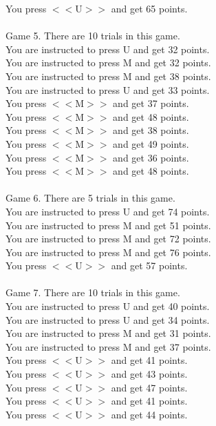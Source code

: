 \documentclass[pdflatex,sn-nature]{sn-jnl}%
\theoremstyle{thmstyleone}%
\theoremstyle{thmstyletwo}%
\theoremstyle{thmstylethree}%
\begin{document}
You press $<<$U$>>$ and get 65 points. $~$\\ 
 $~$\\ 
Game 5. There are 10 trials in this game. $~$\\ 
You are instructed to press U and get 32 points. $~$\\ 
You are instructed to press M and get 32 points. $~$\\ 
You are instructed to press M and get 38 points. $~$\\ 
You are instructed to press U and get 33 points. $~$\\ 
You press $<<$M$>>$ and get 37 points. $~$\\ 
You press $<<$M$>>$ and get 48 points. $~$\\ 
You press $<<$M$>>$ and get 38 points. $~$\\ 
You press $<<$M$>>$ and get 49 points. $~$\\ 
You press $<<$M$>>$ and get 36 points. $~$\\ 
You press $<<$M$>>$ and get 48 points. $~$\\ 
 $~$\\ 
Game 6. There are 5 trials in this game. $~$\\ 
You are instructed to press U and get 74 points. $~$\\ 
You are instructed to press M and get 51 points. $~$\\ 
You are instructed to press M and get 72 points. $~$\\ 
You are instructed to press M and get 76 points. $~$\\ 
You press $<<$U$>>$ and get 57 points. $~$\\ 
 $~$\\ 
Game 7. There are 10 trials in this game. $~$\\ 
You are instructed to press U and get 40 points. $~$\\ 
You are instructed to press U and get 34 points. $~$\\ 
You are instructed to press M and get 31 points. $~$\\ 
You are instructed to press M and get 37 points. $~$\\ 
You press $<<$U$>>$ and get 41 points. $~$\\ 
You press $<<$U$>>$ and get 43 points. $~$\\ 
You press $<<$U$>>$ and get 47 points. $~$\\ 
You press $<<$U$>>$ and get 41 points. $~$\\ 
You press $<<$U$>>$ and get 44 points. $~$\\ 
\end{document}
